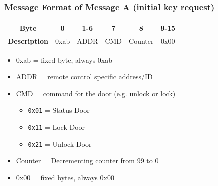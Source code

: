 \documentclass[aspectratio=169]{beamer}
\begin{document}
\begin{frame}
	\frametitle{Message Format of Message A (initial key request)}

	\begin{center}
		\begin{tabular}{|c|c|c|c|c|c|}
			\hline
			\textbf{Byte}        & 0    & 1-6  & 7   & 8       & 9-15 \\
			\hline
			\textbf{Description} & 0xab & ADDR & CMD & Counter & 0x00 \\
			\hline
		\end{tabular}
	\end{center}

	\begin{itemize}
		\item 0xab = fixed byte, always 0xab
		\item ADDR = remote control specific address/ID
		\item CMD = command for the door (e.g. unlock or lock)
			\begin{itemize}
				\item \texttt{0x01} = Status Door
				\item \texttt{0x11} = Lock Door
				\item \texttt{0x21} = Unlock Door
			\end{itemize}
		\item Counter = Decrementing counter from 99 to 0
		\item 0x00 = fixed bytes, always 0x00
	\end{itemize}
\end{frame}
\end{document}
